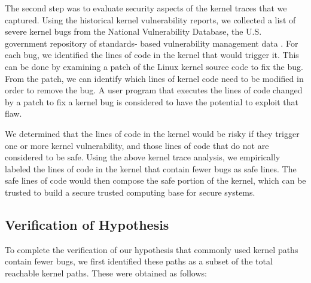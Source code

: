 The second step was to evaluate security aspects of the kernel traces that we captured. 
Using the historical kernel vulnerability reports, we collected a list of severe kernel bugs from 
the National Vulnerability Database, the U.S. government repository of standards- based 
vulnerability management data \cite{NVD}. For each bug, we identified the lines of code 
in the kernel that would trigger it. This can be done by examining 
a patch of the Linux kernel source code to fix the bug. From the patch, 
we can identify which lines of kernel code need to be modified in order to remove the bug. 
A user program that executes the lines of code changed by a patch to fix a kernel bug 
is considered to have the potential to exploit that flaw.

We determined that the lines of code in the kernel would be risky 
if they trigger one or more kernel vulnerability, and those lines of code 
that do not are considered to be safe. Using the above kernel trace analysis, 
we empirically labeled the lines of code in the kernel that contain fewer bugs as safe lines. 
The safe lines of code would then compose the safe portion of the kernel, 
which can be trusted to build a secure trusted computing base for secure systems.

\subsection{Verification of Hypothesis}

To complete the verification of our hypothesis that commonly used kernel paths contain fewer bugs, 
we first identified these paths as a subset of the total reachable kernel paths. These were obtained as follows:

